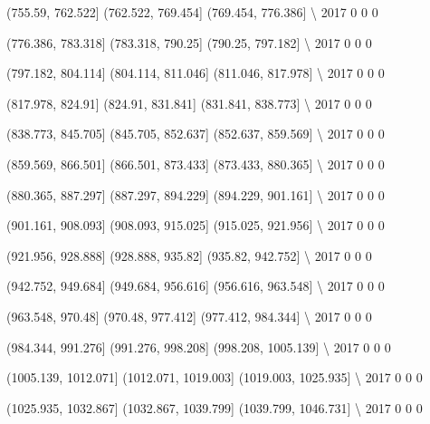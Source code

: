 \documentclass[11pt]{article}
\begin{document}
      (755.59, 762.522]  (762.522, 769.454]  (769.454, 776.386]  \textbackslash{}
2017                  0                   0                   0   

      (776.386, 783.318]  (783.318, 790.25]  (790.25, 797.182]  \textbackslash{}
2017                   0                  0                  0   

      (797.182, 804.114]  (804.114, 811.046]  (811.046, 817.978]  \textbackslash{}
2017                   0                   0                   0   

      (817.978, 824.91]  (824.91, 831.841]  (831.841, 838.773]  \textbackslash{}
2017                  0                  0                   0   

      (838.773, 845.705]  (845.705, 852.637]  (852.637, 859.569]  \textbackslash{}
2017                   0                   0                   0   

      (859.569, 866.501]  (866.501, 873.433]  (873.433, 880.365]  \textbackslash{}
2017                   0                   0                   0   

      (880.365, 887.297]  (887.297, 894.229]  (894.229, 901.161]  \textbackslash{}
2017                   0                   0                   0   

      (901.161, 908.093]  (908.093, 915.025]  (915.025, 921.956]  \textbackslash{}
2017                   0                   0                   0   

      (921.956, 928.888]  (928.888, 935.82]  (935.82, 942.752]  \textbackslash{}
2017                   0                  0                  0   

      (942.752, 949.684]  (949.684, 956.616]  (956.616, 963.548]  \textbackslash{}
2017                   0                   0                   0   

      (963.548, 970.48]  (970.48, 977.412]  (977.412, 984.344]  \textbackslash{}
2017                  0                  0                   0   

      (984.344, 991.276]  (991.276, 998.208]  (998.208, 1005.139]  \textbackslash{}
2017                   0                   0                    0   

      (1005.139, 1012.071]  (1012.071, 1019.003]  (1019.003, 1025.935]  \textbackslash{}
2017                     0                     0                     0   

      (1025.935, 1032.867]  (1032.867, 1039.799]  (1039.799, 1046.731]  \textbackslash{}
2017                     0                     0                     0   
\end{document}

